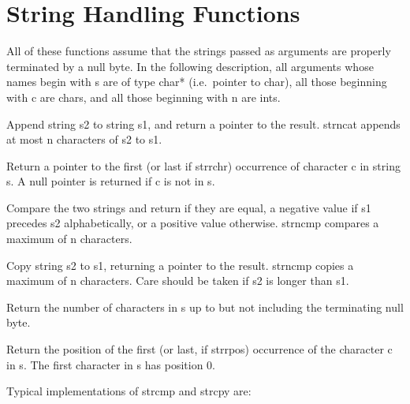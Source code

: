 \section{String Handling Functions}
     All of  these functions  assume that  the strings passed as
arguments are properly terminated  by  a  null byte.  In  the
following  description,  all arguments whose  names begin  with {\cd
s} are of type {\cd char*} (i.e.\ {\ms pointer to char\/}), all those
beginning with {\cd c} are {\cd char}s, and all those beginning with
{\cd n} are {\cd int}s.
 \begin{hanglist}
 Append string {\cd s2} to string {\cd s1}, and return a pointer to the
result. {\cd strncat} appends at most {\cd n} characters of {\cd s2}
to {\cd s1}.

  Return a pointer to the first (or last if {\cd strrchr}) occurrence
of character {\cd c} in string {\cd s}.  A null pointer is returned if
{\cd c} is not in {\cd s}.

 Compare the two strings and return {} if they are equal, a
negative value if {\cd s1} precedes s2 alphabetically, or a positive
value otherwise.  {\cd strncmp} compares a maximum of {\cd n}
characters.

 Copy string {\cd s2} to {\cd s1}, returning a pointer to the result. 
{\cd strncmp} copies a maximum of {\cd n} characters.  Care should be
taken if {\cd s2} is longer than {\cd s1}.

 Return the number of characters in {\cd s} up to but not including
the terminating null byte.

 Return the position of the first (or last, if {\cd strrpos})
occurrence of the character {\cd c} in {\cd s}.  The first character
in {\cd s} has position 0.
\end{hanglist}
Typical implementations of {\cd strcmp} and {\cd strcpy} are:
